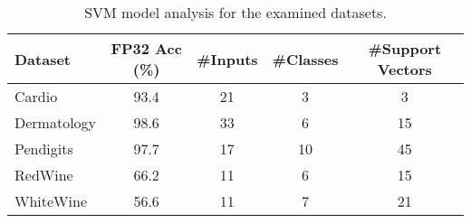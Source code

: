 \begin{table}[t!]
\setlength\tabcolsep{3pt} 
\caption{SVM model analysis for the examined datasets.}
\label{tab:svmfp}
\footnotesize
\centering
\renewcommand{\arraystretch}{1}

\begin{tabular}{l| S[table-format=2.1]S[table-format=2.0]S[table-format=2.0]S[table-format=2.0]}

\hline
\textbf{Dataset} & \textbf{FP32 Acc (\%)} & \textbf{\#Inputs} & \textbf{\#Classes} & \textbf{\#Support Vectors}\\ \hline
Cardio & 93.4 & 21 & 3  & 3 \\
Dermatology & 98.6 & 33 & 6  & 15 \\ 
Pendigits & 97.7 & 17 & 10 & 45 \\
RedWine   & 66.2 & 11 & 6  & 15 \\
WhiteWine & 56.6 & 11  & 7 & 21 \\ \hline
\end{tabular}\vspace{-5ex}

\end{table}